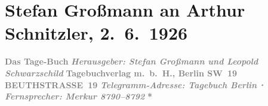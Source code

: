 

         
         \renewcommand{\erwaehntePersonen}{Personen: Stefan Großmann, Carl Ossietzky, Leopold Schwarzschild}
         \renewcommand{\erwaehnteInstitutionen}{Institutionen: Das Tage-Buch}
         \renewcommand{\erwaehnteOrte}{Orte: Berlin, Beuthstrasse, Sternwartestraße, Wien, XVIII., Währing}
         \renewcommand{\erwaehnteWerke}{Werke: Bemerkungen [Korrektur], Buch der Sprüche und Bedenken}
               \section[Stefan Großmann an Arthur Schnitzler, 2. 6. 1926]{ Stefan Großmann an Arthur Schnitzler, 2. 6. 1926}\nopagebreak{}\rehead{ }\begin{ledgroupsized}[t]{13cm}\normalsize\beginnumbering{} \toendnotes[C]{\smallbreak\pagebreak[2]} 
\toendnotes[C]{\smallbreak}\pstart
           \noindent{}\centering{}{\pb}\textcolor{gray}{\textbf{Das Tage-Buch}}\pend
           \pstart
           \noindent{}\centering{}\textcolor{gray}{\textbf{\emph{Herausgeber: Stefan Großmann und Leopold Schwarzschild}}}\pend
           \pstart
           \noindent{}\centering{}\textcolor{gray}{\textbf{Tagebuchverlag m. b. H., Berlin SW 19}}\pend
           \pstart
           \noindent{}\centering{}\textcolor{gray}{\textbf{BEUTHSTRASSE 19}}\pend
           \pstart
           \noindent{}\centering{}\textcolor{gray}{\textbf{\emph{Telegramm-Adresse: Tagebuch Berlin ⋅ Fernsprecher: Merkur 8790–8792}}}\pend
           \pstart
           \noindent{}\centering{}\textcolor{gray}{\textbf{\emph{}}}\pend
           \pstart
           \noindent{}\centering{}\textcolor{gray}{\textbf{*}}\pend

\end{ledgroupsized}
